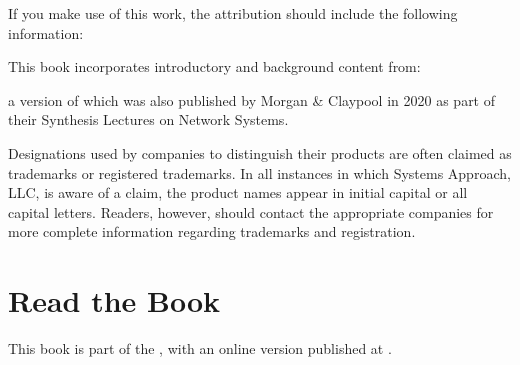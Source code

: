 \documentclass[a4paper,11pt,english]{sphinxmanual}
\begin{document}
\sphinxAtStartPar
If you make use of this work, the attribution should include the
following information:

\begin{DUlineblock}{0em}
\item[] 
\item[] 
\item[]  
\item[]  
\end{DUlineblock}

\sphinxAtStartPar
This book incorporates introductory and background content from:

\begin{DUlineblock}{0em}
\item[] 
\item[] 
\item[]  
\item[]  
\end{DUlineblock}

\sphinxAtStartPar
a version of which was also published by Morgan \& Claypool in 2020
as part of their Synthesis Lectures on Network Systems.

\sphinxAtStartPar
Designations used by companies to distinguish their products are often
claimed as trademarks or registered trademarks. In all instances in
which Systems Approach, LLC, is aware of a claim, the product names
appear in initial capital or all capital letters. Readers, however,
should contact the appropriate companies for more complete information
regarding trademarks and registration.


\section{Read the Book}
\label{\detokenize{README:read-the-book}}
\sphinxAtStartPar
This book is part of the , with an online version published at
.
\end{document}
